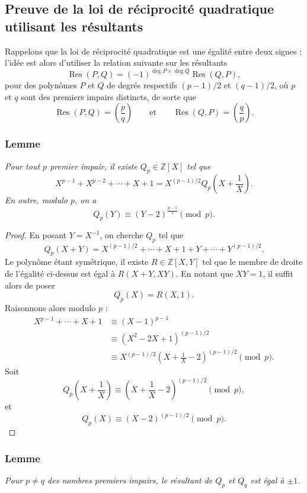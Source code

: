 \subsection{Preuve de la loi de réciprocité quadratique utilisant les résultants}

Rappelons que la loi de réciprocité quadratique est une égalité entre deux
signes ; l'idée est alors d'utiliser la relation suivante sur les résultants
\[
\operatorname{Res}(P,Q)
=
(-1)^{\deg P \times \deg Q}\operatorname{Res}(Q,P),
\]
pour des polynômes \(P\) et \(Q\) de degrés respectifs \((p-1)/2\) et
\((q-1)/2\), où \(p\) et \(q\) sont des premiers impairs distincts, de sorte que
\[
\operatorname{Res}(P,Q)=\left(\frac{p}{q}\right)
\qquad\text{et}\qquad
\operatorname{Res}(Q,P)=\left(\frac{q}{p}\right).
\]

\subsubsection{Lemme}

\textit{Pour tout \(p\) premier impair, il existe \(Q_p\in\mathbb{Z}[X]\) tel que}
\[
X^{p-1}+X^{p-2}+\cdots+X+1
=
X^{(p-1)/2}Q_p\left(X+\frac{1}{X}\right).
\]
\textit{En outre, modulo \(p\), on a}
\[
Q_p(Y)\equiv (Y-2)^{\frac{p-1}{2}}\pmod p.
\]

\begin{proof}
En posant \(Y=X^{-1}\), on cherche \(Q_p\) tel que
\[
Q_p(X+Y)
=
X^{(p-1)/2}+\cdots+X+1+Y+\cdots+Y^{(p-1)/2}.
\]
Le polynôme étant symétrique, il existe \(R\in\mathbb{Z}[X,Y]\) tel que le
membre de droite de l'égalité ci-dessus est égal à \(R(X+Y,XY)\). En notant
que \(XY=1\), il suffit alors de poser
\[
Q_p(X)=R(X,1).
\]
Raisonnons alors modulo \(p\) :
\begin{align*}
X^{p-1}+\cdots+X+1
&\equiv (X-1)^{p-1} \\
&\equiv (X^2-2X+1)^{(p-1)/2} \\
&\equiv
X^{(p-1)/2}
\left(X+\frac{1}{X}-2\right)^{(p-1)/2}
\pmod p.
\end{align*}
Soit
\[
Q_p\left(X+\frac{1}{X}\right)
\equiv
\left(X+\frac{1}{X}-2\right)^{(p-1)/2}
\pmod p,
\]
et
\[
Q_p(X)\equiv (X-2)^{(p-1)/2}\pmod p.
\]
\end{proof}

\subsubsection{Lemme}

\textit{Pour \(p\neq q\) des nombres premiers impairs, le résultant de
\(Q_p\) et \(Q_q\) est égal à \(\pm1\).}

